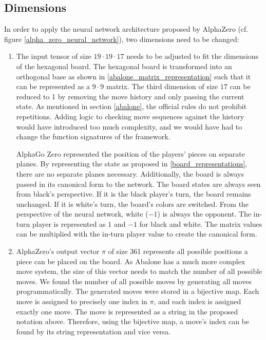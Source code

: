 \subsection{Dimensions}
In order to apply the neural network architecture proposed by AlphaZero (cf. figure \ref{alpha_zero_neural_network}), two dimensions need to be changed:
\begin{enumerate}
    \item The input tensor of size $19 \cdot 19 \cdot 17$ needs to be adjusted to fit the dimensions of the hexagonal board. The hexagonal board is transformed into an orthogonal base as shown in \ref{abalone_matrix_representation} such that it can be represented as a $9 \cdot 9$ matrix.
          The third dimension of size $17$ can be reduced to 1 by removing the move history and only passing the current state. As mentioned in section \ref{abalone}, the official rules do not prohibit repetitions. Adding logic to checking move sequences against the history would have introduced too much complexity, and we would have had to change the function signatures of the framework.

          AlphaGo Zero represented the position of the players' pieces on separate planes. By representing the state as proposed in \ref{board_representations}, there are no separate planes necessary. Additionally, the board is always passed in its canonical form to the network. The board states are always seen from black's perspective. If it is the black player's turn, the board remains unchanged. If it is white's turn, the board's colors are switched. From the perspective of the neural network, white ($-1$) is always the opponent. The in-turn player is represented as $1$ and $-1$ for black and white. The matrix values can be multiplied with the in-turn player value to create the canonical form.
    \item AlphaZero's output vector $\pi$ of size 361 represents all possible positions a piece can be placed on the board. As Abalone has a much more complex move system, the size of this vector needs to match the number of all possible moves. We found the number of all possible moves by generating all moves programmatically. The generated moves were stored in a bijective map. Each move is assigned to precisely one index in $\pi$, and each index is assigned exactly one move. The move is represented as a string in the proposed notation above. Therefore, using the bijective map, a move's index can be found by its string representation and vice versa.


\end{enumerate}
